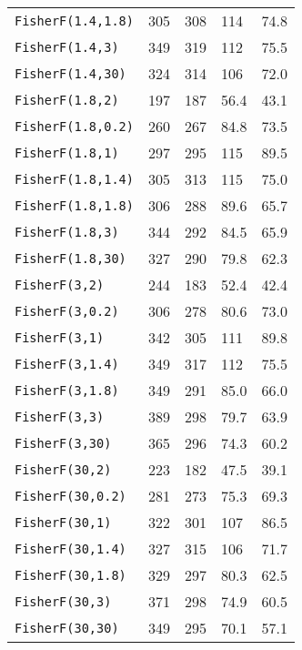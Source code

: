 \begin{tabularx}{\textwidth}{p{2in}XXXX}
  \verb|FisherF(1.4,1.8)| & 305  & 308  & 114  & 74.8 \\
  \verb|FisherF(1.4,3)|   & 349  & 319  & 112  & 75.5 \\
  \verb|FisherF(1.4,30)|  & 324  & 314  & 106  & 72.0 \\
  \verb|FisherF(1.8,2)|   & 197  & 187  & 56.4 & 43.1 \\
  \verb|FisherF(1.8,0.2)| & 260  & 267  & 84.8 & 73.5 \\
  \verb|FisherF(1.8,1)|   & 297  & 295  & 115  & 89.5 \\
  \verb|FisherF(1.8,1.4)| & 305  & 313  & 115  & 75.0 \\
  \verb|FisherF(1.8,1.8)| & 306  & 288  & 89.6 & 65.7 \\
  \verb|FisherF(1.8,3)|   & 344  & 292  & 84.5 & 65.9 \\
  \verb|FisherF(1.8,30)|  & 327  & 290  & 79.8 & 62.3 \\
  \verb|FisherF(3,2)|     & 244  & 183  & 52.4 & 42.4 \\
  \verb|FisherF(3,0.2)|   & 306  & 278  & 80.6 & 73.0 \\
  \verb|FisherF(3,1)|     & 342  & 305  & 111  & 89.8 \\
  \verb|FisherF(3,1.4)|   & 349  & 317  & 112  & 75.5 \\
  \verb|FisherF(3,1.8)|   & 349  & 291  & 85.0 & 66.0 \\
  \verb|FisherF(3,3)|     & 389  & 298  & 79.7 & 63.9 \\
  \verb|FisherF(3,30)|    & 365  & 296  & 74.3 & 60.2 \\
  \verb|FisherF(30,2)|    & 223  & 182  & 47.5 & 39.1 \\
  \verb|FisherF(30,0.2)|  & 281  & 273  & 75.3 & 69.3 \\
  \verb|FisherF(30,1)|    & 322  & 301  & 107  & 86.5 \\
  \verb|FisherF(30,1.4)|  & 327  & 315  & 106  & 71.7 \\
  \verb|FisherF(30,1.8)|  & 329  & 297  & 80.3 & 62.5 \\
  \verb|FisherF(30,3)|    & 371  & 298  & 74.9 & 60.5 \\
  \verb|FisherF(30,30)|   & 349  & 295  & 70.1 & 57.1 \\
  \bottomrule
\end{tabularx}

